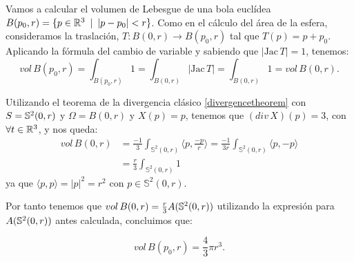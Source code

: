 \begin{remark}
Vamos a calcular el volumen de Lebesgue de una bola euclídea $B(p_0,r)=\{ p \in \mathbb{R}^3 \enspace | \enspace |p-p_0| < r \}$. Como en el cálculo del área de la esfera, consideramos la traslación, $T: B(0, r) \longrightarrow B(p_0, r)$ tal que $T(p) = p + p_0$. Aplicando la fórmula del cambio de variable y sabiendo que $|\text{Jac} \, T|=1$, tenemos:
%
\begin{equation*}
    vol \, B(p_0,r) = \int_{B(p_0,r)} 1 = \int_{B(0,r)} |\text{Jac} \, T| = \int_{B(0,r)} 1 = vol \, B(0,r).
\end{equation*}

Utilizando el teorema de la divergencia clásico \ref{divergencetheorem} con $S=\mathbb{S}^2(0,r)$ y $\Omega=B(0,r)$ y $X(p)=p$, tenemos que $(div \, X)(p)=3$, con $\forall t\in \mathbb{R}^3$, y nos queda:
%
\begin{align*}
    vol \, B(0,r) &= \frac{-1}{3} \int_{\mathbb{S}^2(0,r)}  \langle p, \frac{-p}{r} \rangle = \frac{-1}{3r} \int_{\mathbb{S}^2(0,r)}  \langle p, -p \rangle \\
    &= \frac{r}{3} \int_{\mathbb{S}^2(0,r)} 1
\end{align*}
%
ya que $ \langle p,p \rangle  = |p|^2 = r^2$ con $p \in \mathbb{S}^2(0,r)$.

Por tanto tenemos que $vol \, B(0,r) = \frac{r}{3}A(\mathbb{S}^2(0,r))$ utilizando la expresión para $A(\mathbb{S}^2(0,r))$ antes calculada, concluimos que:

\begin{equation*}
    vol \, B(p_0,r) = \frac{4}{3}\pi r^3.
\end{equation*}
\end{remark}

